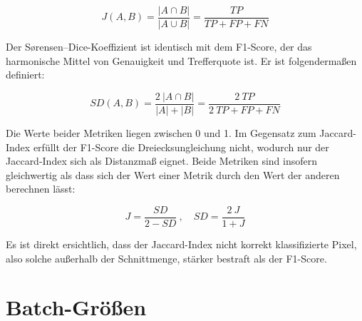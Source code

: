 \begin{equation}
J(A, B) = \frac{| A \cap B |}{| A \cup B |} = \frac{TP}{TP + FP + FN}
\end{equation}

Der Sørensen–Dice-Koeffizient ist identisch mit dem F1-Score, der das harmonische Mittel von Genauigkeit und Trefferquote ist.
Er ist folgendermaßen definiert:

\begin{equation}
SD(A, B) = \frac{2 \ | A \cap B |}{| A | + | B |} = \frac{2 \ TP}{2 \ TP + FP + FN}
\end{equation}

Die Werte beider Metriken liegen zwischen 0 und 1.
Im Gegensatz zum Jaccard-Index erfüllt der F1-Score die Dreiecksungleichung nicht, wodurch nur der Jaccard-Index sich als Distanzmaß eignet.
Beide Metriken sind insofern gleichwertig als dass sich der Wert einer Metrik durch den Wert der anderen berechnen lässt:

\begin{equation}
J = \frac{SD}{2 - SD} \ , \quad SD = \frac{2 \ J}{1 + J}
\end{equation}

Es ist direkt ersichtlich, dass der Jaccard-Index nicht korrekt klassifizierte Pixel, also solche außerhalb der Schnittmenge, stärker bestraft als der F1-Score.



\section{Batch-Größen}


